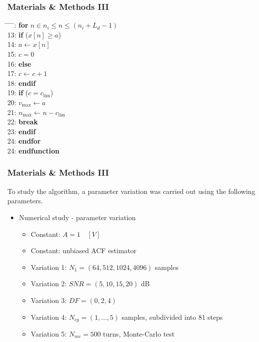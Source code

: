 \documentclass[11pt,aspectratio=169]{beamer}
\begin{document}
	\begin{frame}
		\frametitle{Materials \& Methods III}
		\small
		\begin{tabbing}
			\hspace{0.5cm} \= \hspace{0.5cm} \= \hspace{0.5cm} \= \hspace{0.5cm} \= : \> \> \textbf{for} $n \in n_i \leq n \leq (n_i + L_d - 1)$ \\
			13: \> \> \> \textbf{if} ($x[n] \geq a$)
\\
			14: \> \> \> \> $a \gets x[n]$ \\
			15: \> \> \> \> $c = 0$ \\
			16: \> \> \> \textbf{else}
\\
			17: \> \> \> \> $c \gets c + 1$
\\
			18: \> \> \> \textbf{endif}
\\
			19: \> \> \> \textbf{if} ($c = c_{\lim}$) \\
			20: \> \> \> \> $v_{\max} \gets a$ \\
			21: \> \> \> \> $n_{\max} \gets n - c_{\lim}$ \\
			22: \> \> \> \> \textbf{break}
\\
			23: \> \> \> \textbf{endif}
\\
			24: \> \> \textbf{endfor} \\
			24: \> \textbf{endfunction} \\
		\end{tabbing}
	\end{frame}
	\begin{frame}
		\frametitle{Materials \& Methods III}
		To study the algorithm, a parameter variation was carried out using the following parameters.
		\begin{itemize}
			\setlength\itemsep{0.5em}
			\item \textcolor{RIPtitlecol}{Numerical study - parameter variation}
			\begin{itemize}
				\setlength\itemsep{0.5em}
				\item Constant: $A = 1 \quad [V]$
				\item Constant: unbiased ACF estimator
				\item Variation 1: $N_1 = (64, 512, 1024, 4096)$ samples
				\item Variation 2: $SNR = (5, 10, 15, 20)$ dB
				\item Variation 3: $DF = (0, 2, 4)$
				\item Variation 4: $N_{cy} = (1,\ldots,5)$ samples, subdivided into 81 steps
				\item Variation 5: $N_{mc} = 500$ turns, Monte-Carlo test
			\end{itemize}
		\end{itemize}
	\end{frame}
\end{document}

